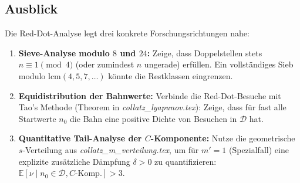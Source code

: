 \documentclass[12pt,a4paper]{article}
\newcommand{\E}{\mathbb{E}}
\begin{document}
\subsection{Ausblick}

Die Red-Dot-Analyse legt drei konkrete Forschungsrichtungen nahe:

\begin{enumerate}[label=\textbf{(\arabic*)}, leftmargin=*]
  \item \textbf{Sieve-Analyse modulo $8$ und $24$:}
    Zeige, dass Doppelstellen stets $n \equiv 1 \pmod 4$ (oder zumindest
    $n$ ungerade) erfüllen. Ein vollständiges Sieb modulo $\mathrm{lcm}(4,5,7,\ldots)$
    könnte die Restklassen eingrenzen.

  \item \textbf{Equidistribution der Bahnwerte:}
    Verbinde die Red-Dot-Besuche mit Tao's Methode (Theorem in
    \textit{collatz\_lyapunov.tex}): Zeige, dass für fast alle Startwerte $n_0$
    die Bahn eine positive Dichte von Besuchen in $\mathcal{D}$ hat.

  \item \textbf{Quantitative Tail-Analyse der $C$-Komponente:}
    Nutze die geometrische $s$-Verteilung aus \textit{collatz\_m\_verteilung.tex},
    um für $m' = 1$ (Spezialfall) eine explizite zusätzliche Dämpfung $\delta > 0$
    zu quantifizieren: $\E[\nu \mid n_0 \in \mathcal{D}, C\text{-Komp.}] > 3$.
\end{enumerate}
\end{document}
